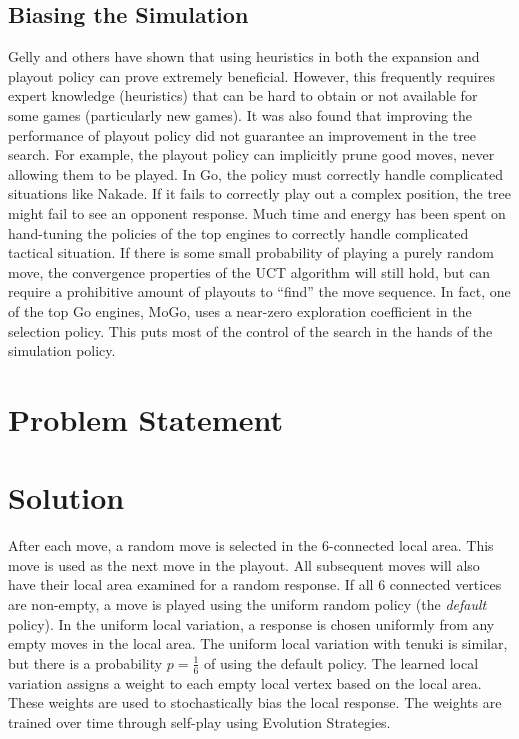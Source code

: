 \documentclass[10pt,a4paper]{report}
\begin{document}
\section{Biasing the Simulation}\label{bias}
Gelly and others have shown that using heuristics in both the expansion and playout policy can prove extremely beneficial\cite{gelly2006modification}\cite{gelly2008achieving}. However, this frequently requires expert knowledge (heuristics) that can be hard to obtain or not available for some games (particularly new games). It was also found that improving the performance of playout policy did not guarantee an improvement in the tree search. For example, the playout policy can implicitly prune good moves, never allowing them to be played. In Go, the policy must correctly handle complicated situations like Nakade. If it fails to correctly play out a complex position, the tree might fail to see an opponent response. Much time and energy has been spent on hand-tuning the policies of the top engines to correctly handle complicated tactical situation. If there is some small probability of playing a purely random move, the convergence properties of the UCT algorithm will still hold, but can require a prohibitive amount of playouts to ``find'' the move sequence. In fact, one of the top Go engines, MoGo, uses a near-zero exploration coefficient in the selection policy\cite{gelly2007combining}. This puts most of the control of the search in the hands of the simulation policy.

\chapter{Problem Statement}\label{problem}

\chapter{Solution}\label{solution}
After each move, a random move is selected in the 6-connected local area. This move is used as the next move in the playout. All subsequent moves will also have their local area examined for a random response. If all 6 connected vertices are non-empty, a move is played using the uniform random policy (the \emph{default} policy). In the uniform local variation, a response is chosen uniformly from any empty moves in the local area. The uniform local variation with tenuki is similar, but there is a probability $p=\frac{1}{6}$ of using the default policy. The learned local variation assigns a weight to each empty local vertex based on the local area. These weights are used to stochastically bias the local response. The weights are trained over time through self-play using Evolution Strategies.
\end{document}
